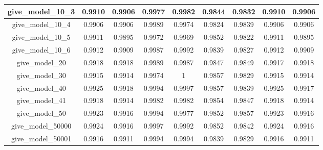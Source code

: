 \begin{table}[!h]
\begin{tabular} {|c|c|c|c|c|c|c|c|c| }
        give\_model\_10\_3                & 0.9910                        & 0.9906                         & 0.9977                      & 0.9982                  & 0.9844 & 0.9832 & 0.9910 & 0.9906 \\ \hline
        give\_model\_10\_4                & 0.9906                        & 0.9906                         & 0.9989                      & 0.9974                  & 0.9824 & 0.9839 & 0.9906 & 0.9906 \\ \hline
        give\_model\_10\_5                & 0.9911                        & 0.9895                         & 0.9972                      & 0.9969                  & 0.9852 & 0.9822 & 0.9911 & 0.9895 \\ \hline
        give\_model\_10\_6                & 0.9912                        & 0.9909                         & 0.9987                      & 0.9992                  & 0.9839 & 0.9827 & 0.9912 & 0.9909 \\ \hline
        give\_model\_20                   & 0.9918                        & 0.9918                         & 0.9989                      & 0.9987                  & 0.9847 & 0.9849 & 0.9917 & 0.9918 \\ \hline
        give\_model\_30                   & 0.9915                        & 0.9914                         & 0.9974                      & 1                       & 0.9857 & 0.9829 & 0.9915 & 0.9914 \\ \hline
        give\_model\_40                   & 0.9925                        & 0.9918                         & 0.9994                      & 0.9997                  & 0.9857 & 0.9839 & 0.9925 & 0.9917 \\ \hline
        give\_model\_41                   & 0.9918                        & 0.9914                         & 0.9982                      & 0.9982                  & 0.9854 & 0.9847 & 0.9918 & 0.9914 \\ \hline
        give\_model\_50                   & 0.9923                        & 0.9916                         & 0.9994                      & 0.9977                  & 0.9852 & 0.9857 & 0.9923 & 0.9916 \\ \hline
        give\_model\_50000                & 0.9924                        & 0.9916                         & 0.9997                      & 0.9992                  & 0.9852 & 0.9842 & 0.9924 & 0.9916 \\ \hline
        give\_model\_50001                & 0.9916                        & 0.9911                         & 0.9994                      & 0.9994                  & 0.9839 & 0.9829 & 0.9916 & 0.9911 \\ \hline

\end{tabular}
\end{table}
